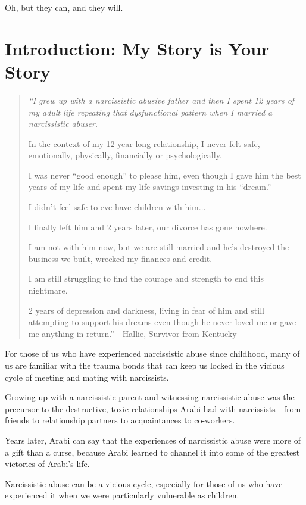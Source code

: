 \documentclass[oneside]{book}
\numberwithin{equation}{section}
\begin{document}
Oh, but they can, and they will.

\section*{Introduction: My Story is Your Story}
\begin{quotation}\it
    ``I grew up with a narcissistic abusive father and then I spent 12 years of my adult life repeating that dysfunctional pattern when I married a narcissistic abuser.
    
    In the context of my 12-year long relationship, I never felt safe, emotionally, physically, financially or psychologically.
    
    I was never ``good enough'' to please him, even though I gave him the best years of my life and spent my life savings investing in his ``dream.''
    
    I didn't feel safe to eve have children with him$\ldots$
    
    I finally left him and 2 years later, our divorce has gone nowhere.
    
    I am not with him now, but we are still married and he's destroyed the business we built, wrecked my finances and credit.
    
    I am still struggling to find the courage and strength to end this nightmare.
    
    2 years of depression and darkness, living in fear of him and still attempting to support his dreams even though he never loved me or gave me anything in return.'' - Hallie, Survivor from Kentucky
\end{quotation}
For those of us who have experienced narcissistic abuse since childhood, many of us are familiar with the trauma bonds that can keep us locked in the vicious cycle of meeting and mating with narcissists.

Growing up with a narcissistic parent and witnessing narcissistic abuse was the precursor to the destructive, toxic relationships Arabi had with narcissists - from friends to relationship partners to acquaintances to co-workers.

Years later, Arabi can say that the experiences of narcissistic abuse were more of a gift than a curse, because Arabi learned to channel it into some of the greatest victories of Arabi's life.

%
Narcissistic abuse can be a vicious cycle, especially for those of us who have experienced it when we were particularly vulnerable as children.
\end{document}
